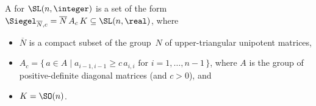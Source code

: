 \begin{defn} \label{WhatIsSiegelSLnROnly}
A  for $\SL(n,\integer)$ is a set of the form $\Siegel_{\overline{N},c} = \overline{N} \, A_c \, K \subseteq \SL(n,\real)$, where 
	\begin{itemize}
	\item $\overline{N}$ is a compact subset of the group~$N$ of upper-triangular unipotent matrices,
	\item $ A_c = \{\, a \in A \mid \text{$a_{i-1,i-1}   \ge c \, a_{i,i}$ for $i = 1,\ldots,n-1$} \,\} $, where $A$ is the group of positive-definite diagonal matrices (and $c > 0$),
	and
	\item $K = \SO(n)$.
	\end{itemize}
\end{defn}

